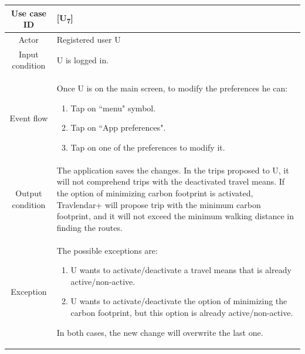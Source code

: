 \documentclass[12pt,titlepage]{article}
\begin{document}
\begin{tabular}{cp{10cm}} 
Use case ID& {[U\textsubscript{7}]}\\ \hline
Actor&Registered user U \\ \hline 

Input condition&U is logged in.\\ \hline
Event flow&Once U is on the main screen, to modify the preferences he can:
\begin{enumerate}
\item Tap on ``menu" symbol.
\item Tap on ``App preferences".
\item Tap on one of the preferences to modify it.
\end{enumerate} 
\\ \hline
Output condition& The application saves the changes. In the trips proposed to U, it will not comprehend trips with the deactivated travel means. If the option of minimizing carbon footprint is activated, Travlendar+ will propose trip with the minimum carbon footprint, and it will not exceed the minimum walking distance in finding the routes. \\ \hline
Exception& The possible exceptions are:
\begin{enumerate}
\item U wants to activate/deactivate a travel means that is already active/non-active.
\item U wants to activate/deactivate the option of minimizing the carbon footprint, but this option is already active/non-active.
\end{enumerate}
In both cases, the new change will overwrite the last one.\\ \hline 

\end{tabular}
\end{document}
